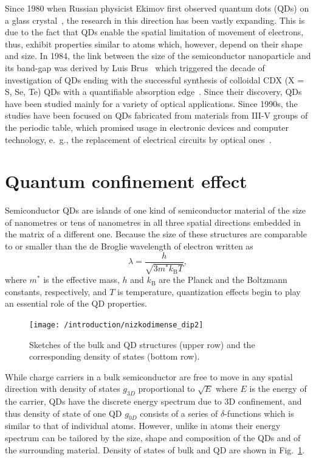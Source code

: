 \documentclass[
a4paper, %
11pt, %
onecolumn, %
openany, %
oldfontcommands,
]{memoir}
\begin{document}
Since 1980 when Russian physicist Ekimov first observed quantum dots (QDs) on a glass crystal~\cite{Ekimov}, the research in this direction has been vastly expanding. This is due to the fact that QDs enable the spatial limitation of movement of electrons, thus, exhibit properties similar to atoms which, however, depend on their shape and size. In 1984, the link between the size of the semiconductor nanoparticle and its band-gap was derived by Luis Brus~\cite{Brus} which triggered the decade of investigation of QDs ending with the successful synthesis of colloidal CDX (X = S, Se, Te) QDs with a quantifiable absorption edge~\cite{Murray}. Since their discovery, QDs have been studied mainly for a variety of optical applications. Since 1990s, the studies have been focused on QDs fabricated from materials from III-V groups of the periodic table, which promised usage in electronic devices and computer technology, e.~g., the replacement of electrical circuits by optical ones~\cite{Bimberg}. %

\section{Quantum confinement effect}
Semiconductor QDs are islands of one kind of semiconductor material of the size of nanometres or tens of nanometres in all three spatial directions embedded in the matrix of a different one. Because the size of these structures are comparable to or smaller than the de Broglie wavelength of electron written as
\begin{equation}
\lambda=\frac{h}{\sqrt{3m^*k_\mathrm{B}T}},
\end{equation}
where $m^*$ is the effective mass, $h$ and $k_\mathrm{B}$ are the Planck and the Boltzmann constants, respectively, and $T$ is temperature, quantization effects begin to play an essential role of the QD properties.


%
\begin{figure}
	\centering
	\texttt{[image: /introduction/nizkodimense\_dip2]}
	\caption{Sketches of the bulk and QD structures (upper row) and the corresponding density of states (bottom row).}
	\label{fig:intr:nizkodimenze}
\end{figure}
%
While charge carriers in a bulk semiconductor are free to move in any spatial direction with density of states $g_{3D}$ proportional to $\sqrt{E}$ where $E$ is the energy of the carrier, QDs have the discrete energy spectrum due to 3D confinement, and thus density of state of one QD $g_{0D}$ consists of a series of $\delta$-functions which is similar to that of individual atoms. However, unlike in atoms their energy spectrum can be tailored by the size, shape and composition of the QDs and of the surrounding material. Density of states of bulk and QD are shown in Fig.~\ref{fig:intr:nizkodimenze}.
\end{document}
